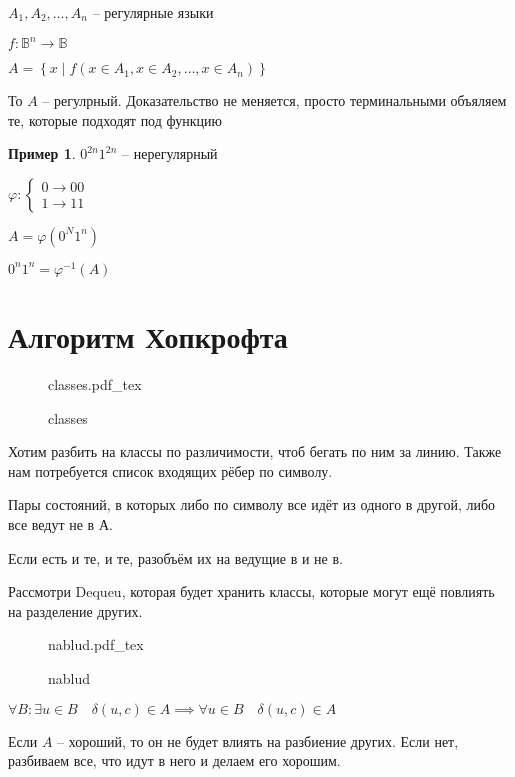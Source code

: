 \documentclass{book}
\theoremstyle{definition}
\newtheorem*{example}{Пример}
\newcommand{\incfig}[1]{%
    \def\svgwidth{\columnwidth}
    {#1.pdf_tex}
}
\begin{document}
\begin{corollary}
    \label{xor-and-whatnot}
    $A_1, A_2, \ldots, A_n$ -- регулярные языки

    $f:\mathbb{B}^n \to \mathbb{B}$

    $A = \left\{ x \mid f\left( x\in A_1, x\in A_2, \ldots, x\in A_n \right)  \right\} $ 

    То $A$ -- регулрный. Доказательство не меняется, просто терминальными объяляем те, которые подходят под функцию
\end{corollary}

\begin{example}
    $0^{2n}1^{2n}$ -- нерегулярный

     $\varphi: \begin{cases}
         0 \to 00\\
         1 \to 11
     \end{cases}$ 

     $A = \varphi\left( 0^N1^n \right) $ 

     $0^n1^n = \varphi^{-1}(A)$
\end{example}

\section{Алгоритм Хопкрофта}

\begin{figure}[!ht]
    \centering
    \incfig{classes}
    \caption{classes}
    \label{fig:classes}
\end{figure}

Хотим разбить на классы по различимости, чтоб бегать по ним за линию. Также нам потребуется список входящих рёбер по символу.

Пары состояний, в которых либо по символу все идёт из одного в другой, либо все ведут не в А.

Если есть и те, и те, разобъём их на ведущие в и не в.

Рассмотри Dequeu, которая будет хранить классы, которые могут ещё повлиять на разделение других.

\begin{figure}[!ht]
    \centering
    \incfig{nablud}
    \caption{nablud}
    \label{fig:nablud}
\end{figure}


$\forall B: \exists u\in B\quad \delta(u,c)\in A \implies \forall u\in B\quad \delta(u,c)\in A$

Если $A$ -- хороший, то он не будет влиять на разбиение других. Если нет, разбиваем все, что идут в него и делаем его хорошим.
\end{document}
